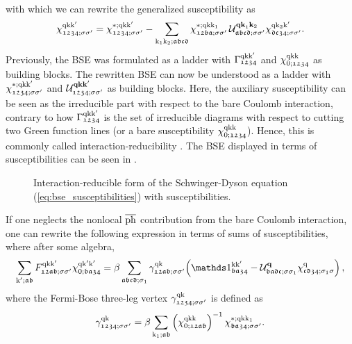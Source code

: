 \documentclass[../../main.tex]{subfiles}
\begin{document}
with which we can rewrite the generalized susceptibility as
\begin{align}\label{eq:bse_susceptibilities}
	\chi_{\mathfrak{1234};\sigma\sigma'}^{\text{q}\text{k}\text{k}'}=\chi_{\mathfrak{1234};\sigma\sigma'}^{*;\text{q}\text{k}\text{k}'}-\sum_{\text{k}_1\text{k}_2;\mathfrak{abcd}}\chi_{\mathfrak{12ba};\sigma\sigma'}^{*;\text{q}\text{k}\text{k}_1}\, \mathcal{U}^{\textbf{qk}_1\textbf{k}_2}_{\mathfrak{abcd};\sigma\sigma'} \chi_{\mathfrak{dc34};\sigma\sigma'}^{\text{q}\text{k}_2\text{k}'}.
\end{align}
Previously, the BSE was formulated as a ladder with $\Gamma_{\mathfrak{1234}}^{\text{q}\text{k}\text{k}'}$ and $\chi_{0;\mathfrak{1234}}^{\text{q}\text{k}\text{k}}$ as building blocks. The rewritten BSE can now be understood as a ladder with $\chi_{\mathfrak{1234};\sigma\sigma'}^{*;\text{q}\text{k}\text{k}'}$ and $\mathcal{U}^{\textbf{qkk}'}_{\mathfrak{1234};\sigma\sigma'}$ as building blocks. Here, the auxiliary susceptibility can be seen as the irreducible part with respect to the bare Coulomb interaction, contrary to how $\Gamma_{\mathfrak{1234}}^{\text{q}\text{k}\text{k}'}$ is the set of irreducible diagrams with respect to cutting two Green function lines (or a bare susceptibility $\chi_{0;\mathfrak{1234}}^{\text{q}\text{k}\text{k}}$). Hence, this is commonly called interaction-reducibility \cite{krien single boson}. The BSE displayed in terms of susceptibilities can be seen in .
\begin{figure}[ht!]
	\centering
  	
  	\caption{Interaction-reducible form of the Schwinger-Dyson equation (\ref{eq:bse_susceptibilities}) with susceptibilities.}
  	\label{fig:bse_susceptibilities}
\end{figure}
If one neglects the nonlocal $\overline{\text{ph}}$ contribution from the bare Coulomb interaction, one can rewrite the following expression in terms of sums of susceptibilities, where after some algebra,
\begin{align}
	\sum_{\kp;\mathfrak{ab}}F_{\mathfrak{12ab};\ss'}^{\q\k\kp}\chi_{0;\mathfrak{ba34}}^{\q\kp\kp}=\beta\sum_{\mathfrak{abcd};\sigma_1}\gamma_{\mathfrak{12ab};\ss'}^{\q\k}\!\left (\unity_{\mathfrak{ba34}}^{\k\kp}-\mathcal{U}^{\vv{q}}_{\mathfrak{badc};\ss_1}\chi^{\q}_{\mathfrak{cd34};\sigma_1\sigma}\right ),
\end{align}
where the Fermi-Bose three-leg vertex $\gamma_{\mathfrak{1234};\sigma\sigma'}^{\text{q}\text{k}}$ is defined as
\begin{align}\label{eq:vrg}
	\gamma_{\mathfrak{1234};\sigma\sigma'}^{\text{q}\text{k}} = \beta \sum_{\text{k}_1;\mathfrak{ab}}\left (\chi_{0;\mathfrak{12ab}}^{\text{q}\text{k}\text{k}}\right )^{-1}\chi_{\mathfrak{ba34};\sigma\sigma'}^{*;\text{q}\text{k}\text{k}_1}.
\end{align}
\end{document}
